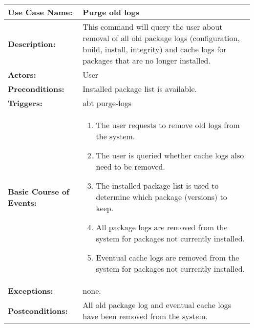 \begin{tabularx}{\linewidth}{|l|X|}
\hline
\textbf{Use Case Name:} & \textbf{Purge old logs} \\
\hline
\textbf{Description:} & 
This command will query the user about removal of all old package logs (configuration, build,
install, integrity) and cache logs for packages that are no longer installed. \\
\hline
\textbf{Actors:} & User \\
\hline
\textbf{Preconditions:} & Installed package list is available. \\
\hline
\textbf{Triggers:} & abt purge-logs \\
\hline
\textbf{Basic Course of Events:} & 
\begin{minipage}{\linewidth} 
  \vspace{0.05em}
  \begin{enumerate}
    \item The user requests to remove old logs from the system.
    \item The user is queried whether cache logs also need to be removed.
    \item The installed package list is used to determine which package (versions) to keep.
    \item All package logs are removed from the system for packages not currently installed.
    \item Eventual cache logs are removed from the system for packages not currently installed.
  \end{enumerate}
  \vspace{0.05em}
\end{minipage}
\\
\hline
\textbf{Exceptions:} & none. \\
\hline 
\textbf{Postconditions:} & All old package log and eventual cache logs have been removed from the system. \\
\hline
\end{tabularx}


